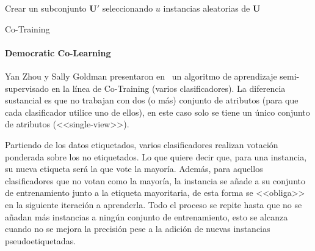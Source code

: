 \begin{algorithm}
    \DontPrintSemicolon
    Crear un subconjunto $\pmb{U'}$ seleccionando $u$ instancias aleatorias de $\pmb{U}$\;
     \caption{Co-Training}\label{pseudo:co-training}
\end{algorithm}

\clearpage
\paragraph{Democratic Co-Learning}

Yan Zhou y Sally Goldman presentaron en~\cite{zhou2004democratic} un algoritmo
de aprendizaje semi-supervisado en la línea de Co-Training (varios
clasificadores). La diferencia sustancial es que no trabajan con dos (o más)
conjunto de atributos (para que cada clasificador utilice uno de ellos), en este
caso solo se tiene un único conjunto de atributos (<<single-view>>).

Partiendo de los datos etiquetados, varios clasificadores realizan votación
ponderada sobre los no etiquetados. Lo que quiere decir que, para una instancia,
su nueva etiqueta será la que vote la mayoría. Además, para aquellos
clasificadores que no votan como la mayoría, la instancia se añade a su conjunto
de entrenamiento junto a la etiqueta mayoritaria, de esta forma se <<obliga>> en
la siguiente iteración a aprenderla. Todo el proceso se repite hasta que no se
añadan más instancias a ningún conjunto de entrenamiento, esto se alcanza cuando
no se mejora la precisión pese a la adición de nuevas instancias
pseudoetiquetadas.

